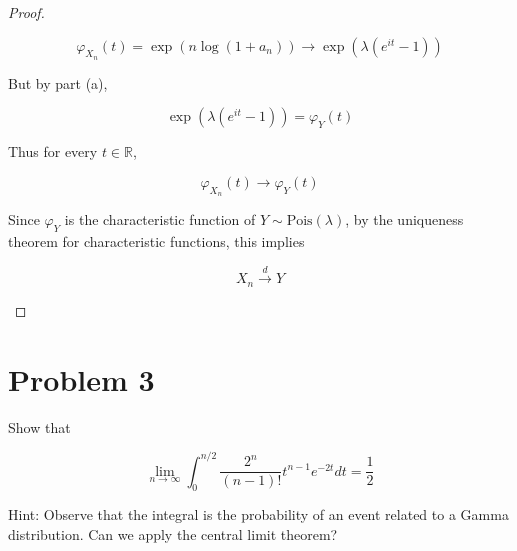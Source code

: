 \begin{proof}
\begin{itemize}
  \[\mathit{\varphi}_{\mathit{X}_{\mathit{n}}}(\mathit{t}) = \exp(\mathit{n}\log(1 + \mathit{a}_{\mathit{n}}))\rightarrow\exp(\mathit{\lambda}(\mathit{e}^{\mathit{i}\mathit{t}} - 1))\]

  But by part (a),

  \[\exp(\mathit{\lambda}(\mathit{e}^{\mathit{i}\mathit{t}} - 1)) = \mathit{\varphi}_{\mathit{Y}}(\mathit{t})\]

  Thus for every \(\mathit{t} \in \mathbb{R}\),

  \[\mathit{\varphi}_{\mathit{X}_{\mathit{n}}}(\mathit{t})\rightarrow\mathit{\varphi}_{\mathit{Y}}(\mathit{t})\]

  Since \(\mathit{\varphi}_{\mathit{Y}}\) is the characteristic function of \(\mathit{Y} \sim \text{Pois}(\mathit{\lambda})\), by the uniqueness theorem for characteristic functions, this implies

  \[\mathit{X}_{\mathit{n}}\overset{\mathit{d}}{\rightarrow}\mathit{Y}\]
\end{itemize}

\end{proof}

\section{Problem 3}\label{hw06-problem-3}

Show that

\[\lim\limits_{\mathit{n}\rightarrow\infty}\int_{0}^{\mathit{n}/2}\frac{2^{\mathit{n}}}{(\mathit{n} - 1)!}\mathit{t}^{\mathit{n} - 1}\mathit{e}^{- 2\mathit{t}}\mathit{d}\mathit{t} = \frac{1}{2}\]

Hint: Observe that the integral is the probability of an event related to a Gamma distribution. Can we apply the central limit theorem?

